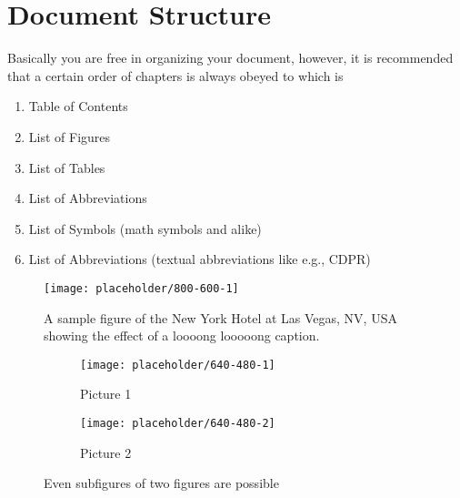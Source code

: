 \documentclass[%
    thesis=ma, %
    language=american, %
    paper=a4,%
    listings,
    online,
    final,
]{isw}
\begin{document}
    \section{Document Structure}
    
    Basically you are free in organizing your document, however, it is recommended that a certain order of chapters is always obeyed to which is
    
    \begin{enumerate}
        \item Table of Contents
        \item List of Figures
        \item List of Tables
        \item List of Abbreviations
        \item List of Symbols (math symbols and alike)
        \item List of Abbreviations (textual abbreviations like e.g., CDPR)
    \end{enumerate}
    
    \begin{figure}
        \centering
        \texttt{[image: placeholder/800-600-1]}
        \caption{A sample figure of the New York Hotel at Las Vegas, NV, USA showing the effect of a loooong looooong caption.}
        \label{fig:sample-figure}
    \end{figure}
    
    \begin{figure}
        \centering
        \begin{subfigure}[b]{0.49\textwidth}
            \texttt{[image: placeholder/640-480-1]}
            \caption{Picture 1}
            \label{fig:subfigures-two:1}
        \end{subfigure}
        \hfill
        \begin{subfigure}[b]{0.49\textwidth}
            \texttt{[image: placeholder/640-480-2]}
            \caption{Picture 2}
            \label{fig:subfigures-two:2}
        \end{subfigure}
        
        \caption{Even subfigures of two figures are possible}
        \label{fig:subfigures-2}
    \end{figure}
    
\end{document}
